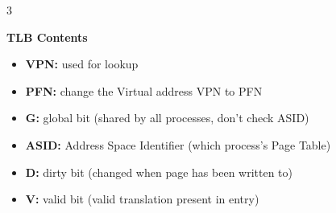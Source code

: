 \documentclass[8pt]{innovativeinnovation-cheatsheet}
\begin{document}
\begin{multicols*}{3}

\textbf{TLB Contents}
\begin{itemize}
      \item \textbf{VPN:} used for lookup
      \item \textbf{PFN:} change the Virtual address VPN to PFN
      \item \textbf{G:} global bit (shared by all processes, don't check ASID)
      \item \textbf{ASID:} Address Space Identifier (which process's Page Table)
      \item \textbf{D:} dirty bit (changed when page has been written to)
      \item \textbf{V:} valid bit (valid translation present in entry)
\end{itemize}





\end{multicols*}
\end{document}
